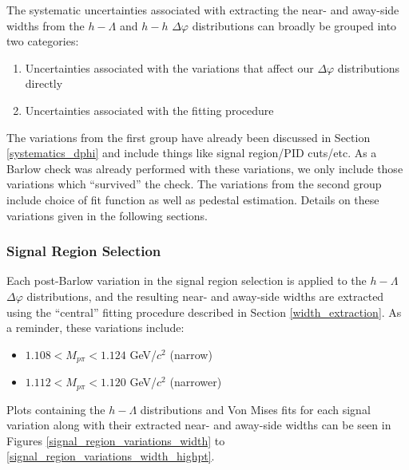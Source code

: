 \documentclass[ALICE,manyauthors]{ALICE_analysis_notes}
\begin{document}
The systematic uncertainties associated with extracting the near- and away-side widths from the $h-\Lambda$ and $h-h$ $\Delta\varphi$ distributions can broadly be grouped into two categories:
\begin{enumerate}
\item Uncertainties associated with the variations that affect our $\Delta\varphi$ distributions directly
\item Uncertainties associated with the fitting procedure
\end{enumerate}
The variations from the first group have already been discussed in Section \ref{systematics_dphi} and include things like signal region/PID cuts/etc. As a Barlow check was already performed with these variations, we only include those variations which ``survived'' the check. The variations from the second group include choice of fit function as well as pedestal estimation. Details on these variations given in the following sections.

\subsubsection{Signal Region Selection}
\label{signal_region_selection_systematics_width}
Each post-Barlow variation in the signal region selection is applied to the $h-\Lambda$ $\Delta\varphi$ distributions, and the resulting near- and away-side widths are extracted using the ``central'' fitting procedure described in Section \ref{width_extraction}. As a reminder, these variations include:

\begin{itemize}
\item $1.108 < M_{p\pi} < 1.124$ GeV/$c^2$ (narrow)
\item $1.112 < M_{p\pi} < 1.120$ GeV/$c^2$ (narrower)
\end{itemize}

Plots containing the $h-\Lambda$ distributions and Von Mises fits for each signal variation along with their extracted near- and away-side widths can be seen in Figures \ref{signal_region_variations_width} to \ref{signal_region_variations_width_highpt}.
\end{document}
